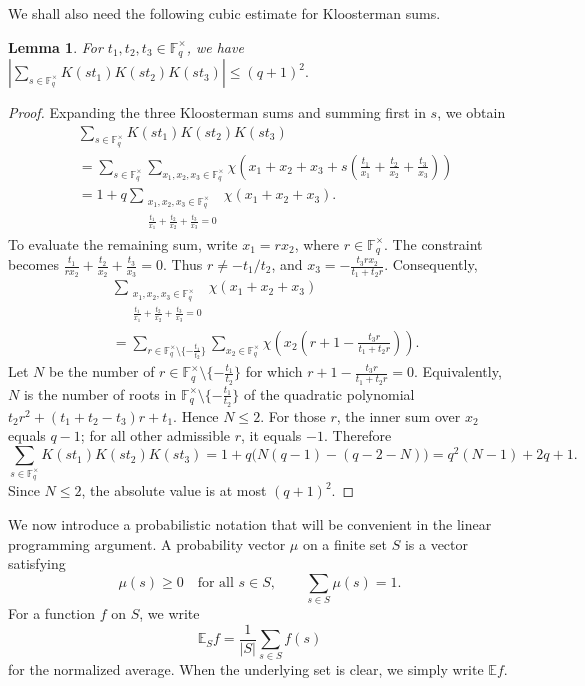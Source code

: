 \documentclass[11pt]{article}
\newtheorem{lemma}[theorem]{Lemma}
\newcommand{\1}{\mathbf{1}}
\begin{document}
We shall also need the following cubic estimate for Kloosterman sums.

\begin{lemma}\label{lem-2}
	For \(t_1,t_2,t_3\in\mathbb{F}_q^\times\), we have $	\left|
	\sum_{s\in\mathbb{F}_q^\times}
	K(st_1)K(st_2)K(st_3)
	\right|
	\le (q+1)^2.$
\end{lemma}

\begin{proof}
	Expanding the three Kloosterman sums and summing first in \(s\), we obtain
	\begin{align*}
		&\sum_{s\in\mathbb{F}_q^\times}
		K(st_1)K(st_2)K(st_3)  \\
		&=
		\sum_{s\in\mathbb{F}_q^\times}
		\sum_{x_1,x_2,x_3\in\mathbb{F}_q^\times}
		\chi\left(
		x_1+x_2+x_3
		+s\left(\frac{t_1}{x_1}+\frac{t_2}{x_2}+\frac{t_3}{x_3}\right)
		\right)  \\
		&=
		1+
		q
		\sum_{\substack{x_1,x_2,x_3\in\mathbb{F}_q^\times\\
				\frac{t_1}{x_1}+\frac{t_2}{x_2}+\frac{t_3}{x_3}=0}}
		\chi(x_1+x_2+x_3).
	\end{align*}
	To evaluate the remaining sum, write \(x_1=rx_2\), where \(r\in\mathbb{F}_q^\times\). The constraint becomes $\frac{t_1}{rx_2}+\frac{t_2}{x_2}+\frac{t_3}{x_3}=0.$
	Thus \(r\ne -t_1/t_2\), and $x_3=-\frac{t_3rx_2}{t_1+t_2r}.$
	Consequently,
	\begin{align*}
		&\sum_{\substack{x_1,x_2,x_3\in\mathbb{F}_q^\times\\
				\frac{t_1}{x_1}+\frac{t_2}{x_2}+\frac{t_3}{x_3}=0}}
		\chi(x_1+x_2+x_3)  \\
		&=
		\sum_{r\in\mathbb{F}_q^\times\setminus\{-\frac{t_1}{t_2}\}}
		\sum_{x_2\in\mathbb{F}_q^\times}
		\chi\left(
		x_2\left(
		r+1-\frac{t_3r}{t_1+t_2r}
		\right)
		\right).
	\end{align*}
	Let \(N\) be the number of \(r\in\mathbb{F}_q^\times\setminus\{-\frac{t_1}{t_2}\}\) for which $r+1-\frac{t_3r}{t_1+t_2r}=0.$
	Equivalently, \(N\) is the number of roots in
	\(\mathbb{F}_q^\times\setminus\{-\frac{t_1}{t_2}\}\) of the quadratic polynomial $t_2r^2+(t_1+t_2-t_3)r+t_1.$
	Hence \(N\le2\). For those \(r\), the inner sum over \(x_2\) equals \(q-1\); for all other admissible \(r\), it equals \(-1\). Therefore
	\[		\sum_{s\in\mathbb{F}_q^\times}
	K(st_1)K(st_2)K(st_3)
	=
	1+q\bigl(N(q-1)-(q-2-N)\bigr) 
	=
	q^2(N-1)+2q+1.\]
	Since \(N\le2\), the absolute value is at most \((q+1)^2\).
\end{proof}

We now introduce a probabilistic notation that will be convenient in the linear programming argument. A probability vector \(\mu\) on a finite set \(S\) is a vector satisfying
\[
\mu(s)\ge0
\quad\text{for all }s\in S,
\qquad
\sum_{s\in S}\mu(s)=1.
\]
For a function \(f\) on \(S\), we write
\[
\mathbb{E}_S f=\frac{1}{|S|}\sum_{s\in S}f(s)
\]
for the normalized average. When the underlying set is clear, we simply write \(\mathbb{E}f\).
\end{document}
